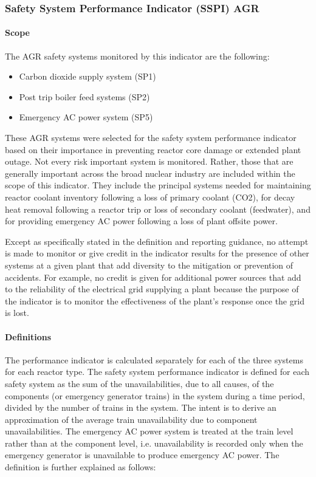 \subsubsection{Safety System Performance Indicator (SSPI) AGR}
\paragraph{Scope}
The AGR safety systems monitored by this indicator are the following:
\begin{itemize}
\item Carbon dioxide supply system (SP1)
\item Post trip boiler feed systems (SP2)
\item Emergency AC power system (SP5)
\end{itemize}

These AGR systems were selected for the safety system performance
indicator based on their importance in preventing reactor core damage
or extended plant outage. Not every risk important system is
monitored. Rather, those that are generally important across the broad
nuclear industry are included within the scope of this indicator. They
include the principal systems needed for maintaining reactor coolant
inventory following a loss of primary coolant (CO2), for decay heat
removal following a reactor trip or loss of secondary coolant
(feedwater), and for providing emergency AC power following a loss of
plant offsite power.

Except as specifically stated in the definition and reporting
guidance, no attempt is made to monitor or give credit in the
indicator results for the presence of other systems at a given plant
that add diversity to the mitigation or prevention of accidents. For
example, no credit is given for additional power sources that add to
the reliability of the electrical grid supplying a plant because the
purpose of the indicator is to monitor the effectiveness of the
plant's response once the grid is lost.

\paragraph{Definitions}

The performance indicator is calculated separately for each of the
three systems for each reactor type. The safety system performance
indicator is defined for each safety system as the sum of the
unavailabilities, due to all causes, of the components (or emergency
generator trains) in the system during a time period, divided by the
number of trains in the system. The intent is to derive an
approximation of the average train unavailability due to component
unavailabilities. The emergency AC power system is treated at the
train level rather than at the component level, i.e. unavailability is
recorded only when the emergency generator is unavailable to produce
emergency AC power. The definition is further explained as follows:

